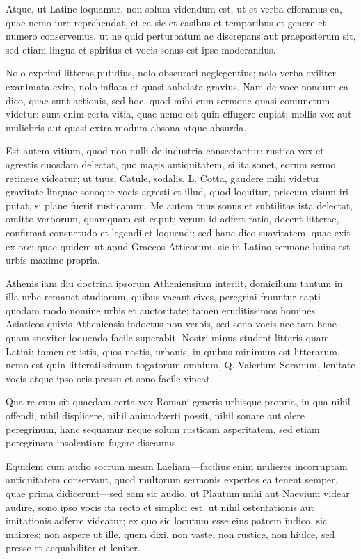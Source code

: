  Atque, ut Latine loquamur, non solum videndum est, ut et verba efferamus ea, quae nemo iure reprehendat, et ea sic et casibus et temporibus et genere et numero conservemus, ut ne quid perturbatum ac discrepans aut praeposterum sit, sed etiam lingua et spiritus et vocis sonus est ipse moderandus.

 Nolo exprimi litteras putidius, nolo obscurari neglegentius; nolo verba exiliter exanimata exire, nolo inflata et quasi anhelata gravius. Nam de voce nondum ea dico, quae sunt actionis, sed hoc, quod mihi cum sermone quasi coniunctum videtur: sunt enim certa vitia, quae nemo est quin effugere cupiat; mollis vox aut muliebris aut quasi extra modum absona atque absurda.

 Est autem vitium, quod non nulli de industria consectantur: rustica vox et agrestis quosdam delectat, quo magis antiquitatem, si ita sonet, eorum sermo retinere videatur; ut tuus, Catule, sodalis, L. Cotta, gaudere mihi videtur gravitate linguae sonoque vocis agresti et illud, quod loquitur, priscum visum iri putat, si plane fuerit rusticanum. Me autem tuus sonus et subtilitas ista delectat, omitto verborum, quamquam est caput; verum id adfert ratio, docent litterae, confirmat consuetudo et legendi et loquendi; sed hanc dico suavitatem, quae exit ex ore; quae quidem ut apud Graecos Atticorum, sic in Latino sermone huius est urbis maxime propria.

 Athenis iam diu doctrina ipsorum Atheniensium interiit, domicilium tantum in illa urbe remanet studiorum, quibus vacant cives, peregrini fruuntur capti quodam modo nomine urbis et auctoritate; tamen eruditissimos homines Asiaticos quivis Atheniensis indoctus non verbis, sed sono vocis nec tam bene quam suaviter loquendo facile superabit. Nostri minus student litteris quam Latini; tamen ex istis, quos nostis, urbanis, in quibus minimum est litterarum, nemo est quin litteratissimum togatorum omnium, Q. Valerium Soranum, lenitate vocis atque ipso oris pressu et sono facile vincat.

 Qua re cum sit quaedam certa vox Romani generis urbisque propria, in qua nihil offendi, nihil displicere, nihil animadverti possit, nihil sonare aut olere peregrinum, hanc sequamur neque solum rusticam asperitatem, sed etiam peregrinam insolentiam fugere discamus.

 Equidem cum audio socrum meam Laeliam—facilius enim mulieres incorruptam antiquitatem conservant, quod multorum sermonis expertes ea tenent semper, quae prima didicerunt—sed eam sic audio, ut Plautum mihi aut Naevium videar audire, sono ipso vocis ita recto et simplici est, ut nihil ostentationis aut imitationis adferre videatur; ex quo sic locutum esse eius patrem iudico, sic maiores; non aspere ut ille, quem dixi, non vaste, non rustice, non hiulce, sed presse et aequabiliter et leniter.


